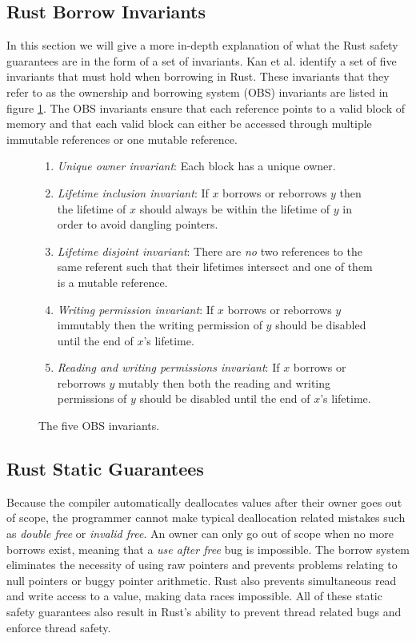 \subsection{Rust Borrow Invariants}
\label{sec:obsinvariants}
In this section we will give a more in-depth explanation of what the Rust safety guarantees are in the form of a set of invariants.
Kan et al. \cite{Kan2018AnEO} identify a set of five invariants that must hold when borrowing in Rust.
These invariants that they refer to as the ownership and borrowing system (OBS) invariants are listed in figure \ref{fig:obsinvariants}.
The OBS invariants ensure that each reference points to a valid block of memory and that each valid block can either be accessed through multiple immutable references or one mutable reference.

\begin{figure}[h]
\centering
\begin{enumerate}
    \item \textit{Unique owner invariant}: Each block has a unique owner.
    \item \textit{Lifetime inclusion invariant}: If $x$ borrows or reborrows $y$ then the lifetime of $x$ should always be within the lifetime of $y$ in order to avoid dangling pointers.
    \item \textit{Lifetime disjoint invariant}: There are \textit{no} two references to the same referent such that their lifetimes intersect and one of them is a mutable reference.
    \item \textit{Writing permission invariant}: If $x$ borrows or reborrows $y$ immutably then the writing permission of $y$ should be disabled until the end of $x$'s lifetime.
    \item \textit{Reading and writing permissions invariant}: If $x$ borrows or reborrows $y$ mutably then both the reading and writing permissions of $y$ should be disabled until the end of $x$'s lifetime.
\end{enumerate}
\caption{The five OBS invariants.\cite{Kan2018AnEO}}
\label{fig:obsinvariants}
\end{figure}

\subsection{Rust Static Guarantees}
Because the compiler automatically deallocates values after their owner goes out of scope, the programmer cannot make typical deallocation related mistakes such as \textit{double free} or \textit{invalid free}.
An owner can only go out of scope when no more borrows exist, meaning that a \textit{use after free} bug is impossible.
The borrow system eliminates the necessity of using raw pointers and prevents problems relating to null pointers or buggy pointer arithmetic.
Rust also prevents simultaneous read and write access to a value, making data races impossible.
All of these static safety guarantees also result in Rust's ability to prevent thread related bugs and enforce thread safety.

